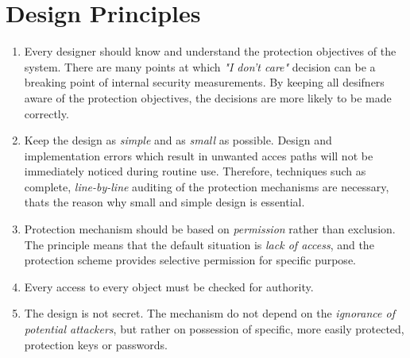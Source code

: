 



\section{Design Principles}

\begin{enumerate}
    \item Every designer should know and understand the protection objectives of the system.
     There are many points at which \textit{"I don't care"} decision can be a breaking point 
     of internal security measurements. By keeping all desifners aware of the protection objectives, 
     the decisions are more likely to be made correctly.
     
     \item Keep the design as \textit{simple} and as \textit{small} as possible. Design and 
     implementation errors which result in unwanted acces paths will not be immediately noticed during 
     routine use. Therefore, techniques such as complete, \textit{line-by-line} auditing of the 
     protection mechanisms are necessary, thats the reason why small and simple design is 
     essential.

     \item Protection mechanism should be based on \textit{permission} rather than exclusion. 
     The principle means that the default situation is \textit{lack of access}, and the protection 
     scheme provides selective permission for specific purpose.

     \item Every access to every object must be checked for authority.
     
     \item The design is not secret. The mechanism do not depend on the \textit{ignorance of potential 
     attackers}, but rather on possession of specific, more easily protected, protection keys or 
     passwords. 


\end{enumerate}
